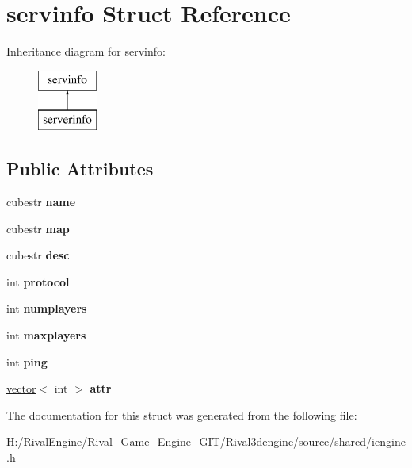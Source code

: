 \hypertarget{structservinfo}{}\section{servinfo Struct Reference}
\label{structservinfo}
Inheritance diagram for servinfo\+:\begin{figure}[H]
\begin{center}
\leavevmode
\includegraphics[height=2.000000cm]{structservinfo}
\end{center}
\end{figure}
\subsection*{Public Attributes}
\begin{DoxyCompactItemize}
\item 
\mbox{\label{structservinfo_a506f1c42cf651b2a7a6510119728ef48}} 
cubestr {\bfseries name}
\item 
\mbox{\label{structservinfo_a06c022e6d8764ecd2ef6e10131f41497}} 
cubestr {\bfseries map}
\item 
\mbox{\label{structservinfo_a72dd6d15711f811832c5b3c51c7d8949}} 
cubestr {\bfseries desc}
\item 
\mbox{\label{structservinfo_acb6a77976f9fdd61dc4522f05cb0cfeb}} 
int {\bfseries protocol}
\item 
\mbox{\label{structservinfo_a4d042a1d603b46d8729461fb2a07645d}} 
int {\bfseries numplayers}
\item 
\mbox{\label{structservinfo_a35acea1e51d273b987b93253e0d38a09}} 
int {\bfseries maxplayers}
\item 
\mbox{\label{structservinfo_aba974ea50bb870c362687b6ece770b76}} 
int {\bfseries ping}
\item 
\mbox{\label{structservinfo_a3ebb5b0eab20a1704277c471c6d0264f}} 
\hyperlink{structvector}{vector}$<$ int $>$ {\bfseries attr}
\end{DoxyCompactItemize}


The documentation for this struct was generated from the following file\+:\begin{DoxyCompactItemize}
\item 
H\+:/\+Rival\+Engine/\+Rival\+\_\+\+Game\+\_\+\+Engine\+\_\+\+G\+I\+T/\+Rival3dengine/source/shared/iengine.\+h\end{DoxyCompactItemize}
